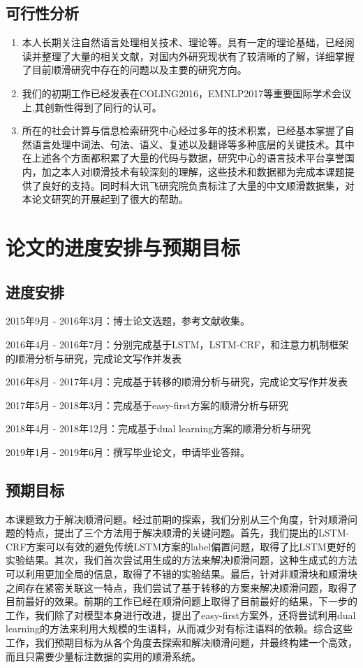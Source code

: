 \subsection{可行性分析}
\begin{enumerate}
	\item 本人长期关注自然语言处理相关技术、理论等。具有一定的理论基础，已经阅读并整理了大量的相关文献，对国内外研究现状有了较清晰的了解，详细掌握了目前顺滑研究中存在的问题以及主要的研究方向。
	
	\item 我们的初期工作已经发表在COLING2016，EMNLP2017等重要国际学术会议上,其创新性得到了同行的认可。
	
	\item 所在的社会计算与信息检索研究中心经过多年的技术积累，已经基本掌握了自然语言处理中词法、句法、语义、复述以及翻译等多种底层的关键技术。其中在上述各个方面都积累了大量的代码与数据，研究中心的语言技术平台享誉国内，加之本人对顺滑技术有较深刻的理解，这些技术和数据都为完成本课题提供了良好的支持。同时科大讯飞研究院负责标注了大量的中文顺滑数据集，对本论文研究的开展起到了很大的帮助。
	
	
	
	
\end{enumerate}
\section{论文的进度安排与预期目标}

\subsection{进度安排}

2015年9月 - 2016年3月：博士论文选题，参考文献收集。

2016年4月 - 2016年7月：分别完成基于LSTM，LSTM-CRF，和注意力机制框架的顺滑分析与研究，完成论文写作并发表

2016年8月 - 2017年4月：完成基于转移的顺滑分析与研究，完成论文写作并发表

2017年5月 - 2018年3月：完成基于easy-first方案的顺滑分析与研究

2018年4月 - 2018年12月：完成基于dual learning方案的顺滑分析与研究

2019年1月 - 2019年6月：撰写毕业论文，申请毕业答辩。

\subsection{预期目标}
本课题致力于解决顺滑问题。经过前期的探索，我们分别从三个角度，针对顺滑问题的特点，提出了三个方法用于解决顺滑的关键问题。首先，我们提出的LSTM-CRF方案可以有效的避免传统LSTM方案的label偏置问题，取得了比LSTM更好的实验结果。其次，我们首次尝试用生成的方法来解决顺滑问题，这种生成式的方法可以利用更加全局的信息，取得了不错的实验结果。最后，针对非顺滑块和顺滑块之间存在紧密关联这一特点，我们尝试了基于转移的方案来解决顺滑问题，取得了目前最好的效果。前期的工作已经在顺滑问题上取得了目前最好的结果，下一步的工作，我们除了对模型本身进行改进，提出了easy-first方案外，还将尝试利用dual learning的方法来利用大规模的生语料，从而减少对有标注语料的依赖。综合这些工作，我们预期目标为从各个角度去探索和解决顺滑问题，并最终构建一个高效，而且只需要少量标注数据的实用的顺滑系统。

